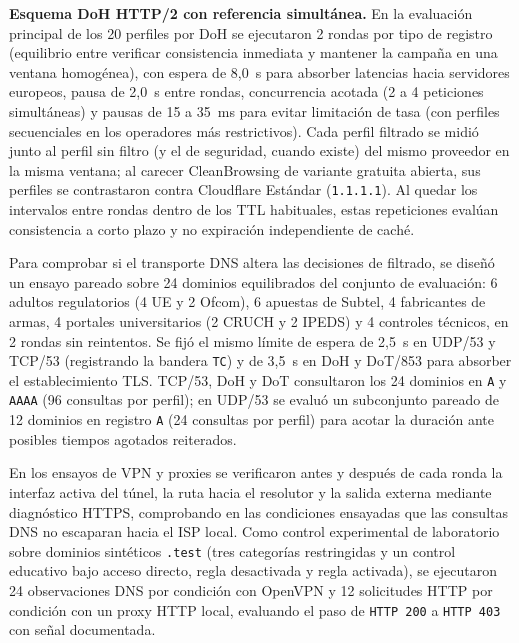 \documentclass[10pt,a4paper]{article}
\begin{document}
\textbf{Esquema DoH HTTP/2 con referencia simultánea.} En la evaluación principal de los 20 perfiles por DoH se ejecutaron 2 rondas por tipo de registro (equilibrio entre verificar consistencia inmediata y mantener la campaña en una ventana homogénea), con espera de 8,0~s para absorber latencias hacia servidores europeos, pausa de 2,0~s entre rondas, concurrencia acotada (2 a 4 peticiones simultáneas) y pausas de 15 a 35~ms para evitar limitación de tasa (con perfiles secuenciales en los operadores más restrictivos). Cada perfil filtrado se midió junto al perfil sin filtro (y el de seguridad, cuando existe) del mismo proveedor en la misma ventana; al carecer CleanBrowsing de variante gratuita abierta, sus perfiles se contrastaron contra Cloudflare Estándar (\texttt{1.1.1.1}). Al quedar los intervalos entre rondas dentro de los TTL habituales, estas repeticiones evalúan consistencia a corto plazo y no expiración independiente de caché.

Para comprobar si el transporte DNS altera las decisiones de filtrado, se diseñó un ensayo pareado sobre 24 dominios equilibrados del conjunto de evaluación: 6 adultos regulatorios (4 UE y 2 Ofcom), 6 apuestas de Subtel, 4 fabricantes de armas, 4 portales universitarios (2 CRUCH y 2 IPEDS) y 4 controles técnicos, en 2 rondas sin reintentos. Se fijó el mismo límite de espera de 2,5~s en UDP/53 y TCP/53 (registrando la bandera \texttt{TC}) y de 3,5~s en DoH y DoT/853 \cite{rfc7858} para absorber el establecimiento TLS. TCP/53, DoH y DoT consultaron los 24 dominios en \texttt{A} y \texttt{AAAA} (96 consultas por perfil); en UDP/53 se evaluó un subconjunto pareado de 12 dominios en registro \texttt{A} (24 consultas por perfil) para acotar la duración ante posibles tiempos agotados reiterados.

En los ensayos de VPN y proxies se verificaron antes y después de cada ronda la interfaz activa del túnel, la ruta hacia el resolutor y la salida externa mediante diagnóstico HTTPS, comprobando en las condiciones ensayadas que las consultas DNS no escaparan hacia el ISP local. Como control experimental de laboratorio sobre dominios sintéticos \texttt{.test} \cite{rfc2606} (tres categorías restringidas y un control educativo bajo acceso directo, regla desactivada y regla activada), se ejecutaron 24 observaciones DNS por condición con OpenVPN y 12 solicitudes HTTP por condición con un proxy HTTP local, evaluando el paso de \texttt{HTTP 200} a \texttt{HTTP 403} con señal documentada.
\end{document}
